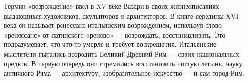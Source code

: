 




Термин «возрождение» ввел в XV веке Вазари в своих жизнеописаниях выдающихся художников, скульпторов и архитекторов. В книге середины XVI века он называет ренессанс итальянским возрождением, используя слово «ренессанс» от латинского «реново» --- возрождать, восстанавливать.
Это подразумевает, что что-то умерло и требует воскрешения. Итальянские мыслители пытались возродить Великий Древний Рим --- своих национальных предков. В первую очередь они стремились восстановить чистую латынь, науку античного Рима --- архитектуру, изобразительное искусство --- и сам город Рим.

